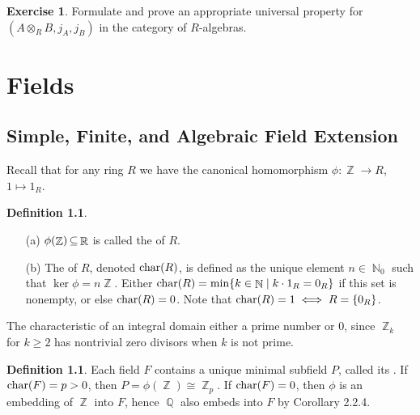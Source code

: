 \documentclass[11pt]{book}
\newcounter{counter}
\theoremstyle{definition}   \newtheorem{defn}[counter]{Definition} %
\newtheorem{exercise}[counter]{Exercise}
\DeclareMathOperator{\R}{\mathbb{R}}   \DeclareMathOperator{\N}{\mathbb{N}}   \DeclareMathOperator{\z}{\mathbb{Z}}   \DeclareMathOperator{\Q}{\mathbb{Q}}
\DeclareMathOperator{\ra}{\rightarrow}   \DeclareMathOperator{\Poly}{\mathbf{P}}   \DeclareMathOperator{\spn}{\textnormal{span}}   \DeclareMathOperator{\aut}{\textnormal{Aut}}
\newcommand{\vs}{\vspace{8pt}}   \newcommand{\hs}{\hspace{8pt}}
\numberwithin{counter}{chapter}
\begin{document}
\vs

\begin{exercise}
Formulate and prove an appropriate universal property for $(A \otimes_R B, j_A, j_B)$ in the category of $R$-algebras. 
\end{exercise}





\part{Fields}






\chapter{Simple, Finite, and Algebraic Field Extension}



Recall that for any ring $R$ we have the canonical homomorphism $\phi : \z \ra R$, $1 \mapsto 1_R$.

\begin{defn}\ 
\begin{enumerate}
\item[(a)] $\phi(\z) \sub \R$ is called the  of $R$.
\item[(b)] The \tb{characteristic} of $R$, denoted $\textnormal{char}(R)$, is defined as the unique element $n \in \N_0$ such that $\ker \phi = n\z$. Either $\tn{char}(R) = \min\{k \in \N \mid k \cdot 1_R = 0_R\}$ if this set is nonempty, or else $\textnormal{char}(R) = 0$. Note that $\textnormal{char}(R) = 1 \iff R = \{0_R\}$.
\end{enumerate}
\end{defn}

\vs

\begin{remark}
The characteristic of an integral domain either a prime number or $0$, since $\z_k$ for $k \geq 2$ has nontrivial zero divisors when $k$ is not prime.
\end{remark}

\vs

\begin{defn}
Each field $F$ contains a unique minimal subfield $P$, called its . If $\textnormal{char}(F) = p > 0$, then $P = \phi(\z) \cong \z_p$. If $\textnormal{char}(F) = 0$, then $\phi$ is an embedding of $\z$ into $F$, hence $\Q$ also embeds into $F$ by Corollary 2.2.4. 
\end{defn}
\end{document}
